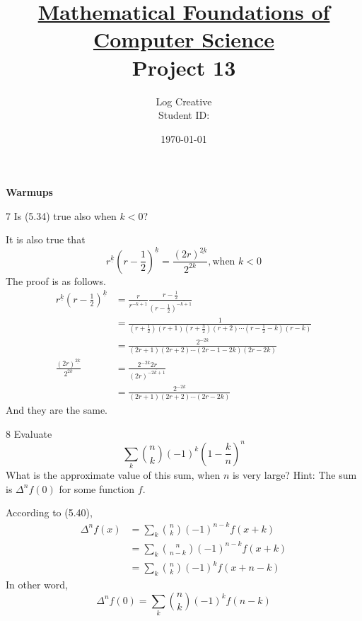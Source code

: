 \documentclass[a4paper,12pt]{article}
\title{\small \underline{Mathematical Foundations of Computer Science}\\\Large Project 13}
\author{Log Creative\\\small Student ID: }
\date{\today}
\makeatletter
\newtheorem*{solution}{Solution}
\theoremstyle{definition}
\renewenvironment{solution}[1][Solution] {\par\pushQED{\qed}\normalfont\topsep6\p@\@plus6\p@\relax\trivlist\item[\hskip\labelsep\bfseries#1\@addpunct{.}]\ignorespaces}{\popQED\endtrivlist\@endpefalse} \makeatother
\newenvironment{problems}{\begin{list}{}{\renewcommand{\makelabel}[1]{\textbf{##1}\hfil}}}{\end{list}}
\makeatother
\begin{document}
\maketitle

\noindent\textbf{Warmups}

\begin{problems}
   \item[7]Is (5.34) true also when $k < 0$?
   \begin{solution}
        It is also true that 
        \begin{equation*}
            r^{\underline{k}}\left(r-\frac{1}{2}\right)^{\underline{k}}= \frac{(2r)^{\underline{2k}}}{2^{2k}}, \text{when } k<0
        \end{equation*}
        The proof is as follows.
        \begin{align*}
            r^{\underline{k}}\left(r-\frac{1}{2}\right)^{\underline{k}} &= \frac{r}{r^{\overline{-k+1}}}\frac{r-\frac{1}{2}}{\left(r-\frac{1}{2}\right)^{\overline{-k+1}}} \\
            &= \frac{1}{(r+\frac{1}{2})(r+1)(r+\frac{3}{2})(r+2)\cdots(r-\frac{1}{2}-k)(r-k)} \\
            &= \frac{2^{-2k}}{(2r+1)(2r+2)\cdots(2r-1-2k)(2r-2k)}\\
            \frac{(2r)^{\underline{2k}}}{2^{2k}} &= \frac{2^{-2k}2r}{(2r)^{\overline{-2k+1}}}\\ 
            &= \frac{2^{-2k}}{(2r+1)(2r+2)\cdots(2r-2k)}
        \end{align*}
        And they are the same.
   \end{solution}
   \item[8]Evaluate 
   \begin{equation*}
       \sum_k\binom{n}{k}(-1)^k\left(1-\frac{k}{n}\right)^n
   \end{equation*}
   What is the approximate value of this sum, when $n$ is very large? Hint: The sum is $\Delta^n f(0)$ for some function $f$.
   \begin{solution}
       According to (5.40),
       \begin{align*}
           \Delta^n f(x) &= \sum_k\binom{n}{k}(-1)^{n-k}f(x+k) \\&=\sum_k\binom{n}{n-k}(-1)^{n-k}f(x+k)\\ &= \sum_k\binom{n}{k}(-1)^{k}f(x+n-k)
       \end{align*}
       In other word,
       \begin{equation*}
        \Delta^n f(0)  = \sum_k\binom{n}{k}(-1)^{k}f(n-k)

\end{equation*}
\end{solution}
\end{problems}
\end{document}
